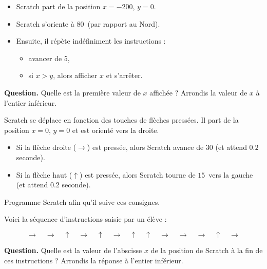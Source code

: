 \documentclass[class=report,crop=false, 12pt]{standalone}
\begin{document}


\begin{enigme}
\sauteligne

\begin{itemize}
  \item Scratch part de la position $x=-200$, $y=0$.
  \item Scratch s'oriente à $80$\textdegree\ (par rapport au Nord).
  \item Ensuite, il répète indéfiniment les instructions :
    \begin{itemize}
      \item avancer de 5,
      \item si $x > y$, alors afficher $x$ et s'arrêter.
    \end{itemize}
\end{itemize}

\bigskip

\textbf{Question.} Quelle est la première valeur de $x$ affichée ?
Arrondis la valeur de $x$ à l'entier inférieur.



\end{enigme}


\begin{enigme}


Scratch se déplace en fonction des touches de flèches pressées.
Il part de la position $x=0$, $y=0$ et est orienté vers la droite.

\begin{itemize}
  \item Si la flèche droite ($\rightarrow$) est pressée, alors Scratch avance de $30$
  (et attend $0.2$ seconde).
  \item Si la flèche haut ($\uparrow$) est pressée, alors Scratch tourne de $15$\textdegree\  vers la gauche (et attend $0.2$ seconde).  
\end{itemize}

Programme Scratch afin qu'il suive ces consignes.

\bigskip

Voici la séquence d'instructions saisie par un élève :

{\Large
$$\rightarrow \quad \rightarrow \quad \uparrow \quad \rightarrow \quad \uparrow \quad \rightarrow \quad \uparrow \quad \uparrow \quad \rightarrow \quad 
\rightarrow \quad \rightarrow \quad \uparrow \quad \rightarrow $$
}

\bigskip

\textbf{Question.} Quelle est la valeur de l'abscisse $x$ de la position de Scratch à la fin de ces instructions ?
Arrondis la réponse à l'entier inférieur.


\end{enigme}
\end{document}
